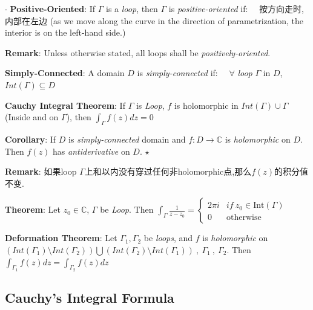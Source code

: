 \documentclass[9pt]{article}
\begin{document}
$\cdot$ \textbf{Positive-Oriented}: {\small If $\Gamma$ is a \textit{loop}, then $\Gamma$ is \textit{positive-oriented} if:} \ \ {\scriptsize 按方向走时,内部在左边} {\tiny (as we move along the curve in the direction of parametrization, the interior is on the left-hand side.)}

\quad \textbf{Remark}: Unless otherwise stated, all loops shall be \textit{positively-oriented}.

\textbf{Simply-Connected}: A domain $D$ is \textit{simply-connected} if: \ \ $\forall$ \textit{loop} $\Gamma$ in $D$, $Int(\Gamma)\subseteq D$ 

\textbf{Cauchy Integral Theorem}: If $\Gamma$ is \textit{Loop}, $f$ is holomorphic in $Int(\Gamma)\cup \Gamma$ {\scriptsize (Inside and on $\Gamma$)}, then $\int_{\Gamma}f(z)dz=0$

\quad \textbf{Corollary}: If $D$ is \textit{simply-connected} domain and $f:D\to\mathbb{C}$ is \textit{holomorphic} on $D$. Then $f(z)$ has \textit{antiderivative} on $D$. $\star$ 

\qquad\qquad{}

\quad \textbf{Remark}: {\small 如果loop $\Gamma$上和以内没有穿过任何非holomorphic点,那么$f(z)$的积分值不变.}

\textbf{Theorem}: Let $z_0\in\mathbb{C}$, $\Gamma$ be \textit{Loop}. Then $\int_\Gamma \frac{1}{z-z_0}=\begin{cases}2\pi i & if \ z_0\in\text{Int}(\Gamma) \\ 0 & \text{otherwise} \end{cases}$

\textbf{Deformation Theorem}: {\footnotesize Let $\Gamma_1,\Gamma_2$ be \textit{loops}, and $f$ is \textit{holomorphic} on $\left(Int(\Gamma_1)\setminus Int(\Gamma_2)\right)\bigcup\left(Int(\Gamma_2)\setminus Int(\Gamma_1)\right) \ , \ \Gamma_1 \ , \ \Gamma_2$. Then $\int_{\Gamma_1}f(z)dz=\int_{\Gamma_2}f(z)dz$}

 


\subsection{Cauchy's Integral Formula} %
\end{document}
